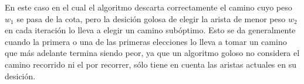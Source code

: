 En este caso en el cual el algoritmo descarta correctamente el camino cuyo peso $w_1$ se pasa de la cota, pero la desici\'on golosa de elegir la arista de menor peso $w_2$ en cada iteraci\'on lo lleva a elegir un camino sub\'optimo. Esto se da generalmente cuando la primera o una de las primeras elecciones lo lleva a tomar un camino que m\'as adelante termina siendo peor, ya que un algoritmo goloso no considera el camino recorrido ni el por recorrer, s\'olo tiene en cuenta las aristas actuales en su desici\'on.